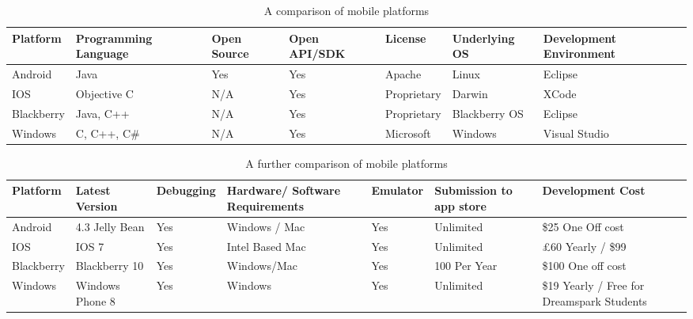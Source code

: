 \newpage
\begin{landscape}
\begin{table}
    \begin{tabular}{|l|l|l|l|l|l|l|}
    \hline
                      Platform & Programming Language & Open Source & Open API/SDK & License     & Underlying OS & Development Environment \\ \hline
    Android                    & Java                 & Yes         & Yes          & Apache      & Linux         & Eclipse                 \\ \hline
    IOS                        & Objective C          & N/A         & Yes          & Proprietary & Darwin        & XCode                   \\ \hline
    Blackberry                 & Java, C++            & N/A         & Yes          & Proprietary & Blackberry OS & Eclipse                 \\ \hline
    Windows                    & C, C++, C\#           & N/A         & Yes          & Microsoft   & Windows       & Visual Studio           \\ \hline
    \end{tabular}
    \caption {A comparison of mobile platforms}
\end{table}


\begin{table}
    \begin{tabular}{|l|l|l|l|l|l|l|}
    \hline
    Platform   & Latest Version    & Debugging & Hardware/ Software Requirements & Emulator & Submission to app store & Development Cost                            \\ \hline
    Android    & 4.3 Jelly   Bean  & Yes       & Windows   / Mac                 & Yes      & Unlimited               & \$25 One   Off cost                          \\ \hline
    IOS        & IOS 7             & Yes       & Intel   Based Mac               & Yes      & Unlimited               & \pounds60   Yearly / \$99                          \\ \hline
    Blackberry & Blackberry   10   & Yes       & Windows/Mac                     & Yes      & 100 Per   Year          & \$100   One off cost                         \\ \hline
    Windows    & Windows   Phone 8 & Yes       & Windows                         & Yes      & Unlimited               & \$19   Yearly / Free for Dreamspark Students \\ \hline
    \end{tabular}
    \caption {A further comparison of mobile platforms}
\end{table}

\end{landscape}

